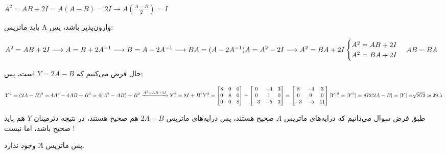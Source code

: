 \setLTR
$
A^2 = AB + 2I  = A(A-B) = 2I \longrightarrow A(\frac{A-B}{2}) = I
$
\setRTL

باید ماتریس A وارون‌پذیر باشد، پس:

\setLTR
$
A^2 = AB + 2I \longrightarrow A = B + 2A^{-1} \longrightarrow B = A - 2A^{-1} \\ \longrightarrow BA = (A-2A^{-1})A = A^2 -2I \longrightarrow A^2 = BA + 2I \\ \\
\begin{cases}
	A^2 = AB + 2I  \\
	A^2 = BA + 2I
\end{cases} $\longrightarrow$ AB = BA
$

\setRTL


حال فرض می‌کنیم که 
$Y = 2A - B$
است، پس:

\setLTR
$
Y ^ 2 = (2A - B)^2 = 4A^2 - 4AB + B^2 = 4(A^2 -AB) + B^2 \xrightarrow{A^2 = AB + 2I} Y^2 = 8I + B^2 \\ \\
Y^2 = \begin{bmatrix}
	8 & 0 & 0 \\
	0 & 8 & 0 \\
	0 & 0 & 8
\end{bmatrix} + 
\begin{bmatrix}
	0 & -4 & 3 \\
	0 & 1 & 0 \\
	-3 & -5 & 3 
\end{bmatrix} = 
\begin{bmatrix}
	8 & -4 & 3 \\
	0 & 9 & 0 \\
	-3 & -5 & 11
\end{bmatrix} \\ \\
|Y|^2 = |Y^2| =872 \\ \\ 
|2A-B| = |Y| = \sqrt[]{872} \simeq 29.5
$
\setRTL

طبق فرض سوال می‌دانیم که درایه‌های ماتریس
$A$
صحیح هستند، پس درایه‌های ماتریس 
$2A-B$
هم صحیح هستند، در نتیجه دترمینان 
$Y$
هم باید صحیح باشد، اما نیست !

پس ماتریس 
$َA$
وجود ندارد.
